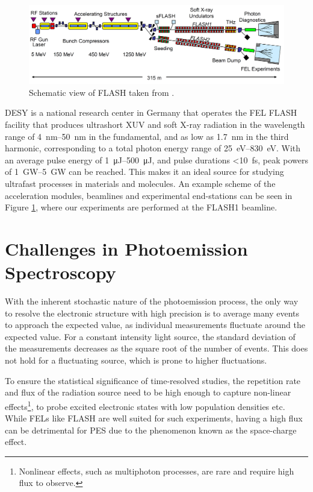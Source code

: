 \begin{figure}
    \includegraphics[width=1\linewidth]{images/flash_fel.png}
    \caption{Schematic view of \gls{FLASH} taken from \cite{faatzSimultaneousOperationTwo2016}.}
    \label{fig:flash-schematic}
\end{figure}

\gls{DESY} is a national research center in Germany that operates the \gls{FEL} \gls{FLASH} facility \cite{ackermannOperationFreeelectronLaser2007,tiedtkeSoftXrayFreeelectron2009} that produces ultrashort \gls{XUV} and soft X-ray radiation in the wavelength range of \qtyrange{4}{50}{\nm} in the fundamental, and as low as \qty{1.7}{\nm} in the third harmonic, corresponding to a total photon energy range of \qtyrange{25}{830}{\eV}. With an average pulse energy of \qtyrange{1}{500}{\micro\joule}, and pulse durations \qty{<10}{\fs}, peak powers of \qtyrange{1}{5}{\giga\watt} can be reached. This makes it an ideal source for studying ultrafast processes in materials and molecules. An example scheme of the acceleration modules, \glspl{beamline} and experimental end-stations can be seen in Figure \ref{fig:flash-schematic}, where our experiments are performed at the FLASH1 beamline.

\section{Challenges in Photoemission Spectroscopy}
With the inherent stochastic nature of the photoemission process, the only way to resolve the electronic structure with high precision is to average many events to approach the expected value, as individual measurements fluctuate around the expected value. For a constant intensity light source, the standard deviation of the measurements decreases as the square root of the number of events. This does not hold for a fluctuating source, which is prone to higher fluctuations. 

To ensure the statistical significance of time-resolved studies, the repetition rate and flux of the radiation source need to be high enough to capture non-linear effects\footnote{Nonlinear effects, such as multiphoton processes, are rare and require high flux to observe.}, to probe excited electronic states with low population densities etc. While \glspl{FEL} like \gls{FLASH} are well suited for such experiments, having a high flux can be detrimental for \gls{PES} due to the phenomenon known as the space-charge effect.

